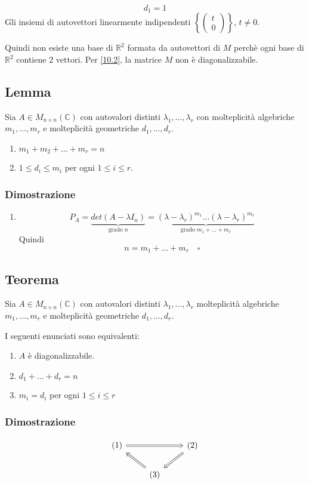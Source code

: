 \documentclass[a4paper]{article}
\theoremstyle{break}
\theoremstyle{break}
\theoremstyle{break}
\theoremstyle{break}
\begin{document}
\begin{example}
  \[
  d_1 = 1
  \] 
  Gli insiemi di autovettori linearmente indipendenti \( \left\{ \begin{pmatrix} t\\0 \end{pmatrix}  \right\} \),
  \( t \neq 0 \).

  \vspace{1em}
  \noindent Quindi non esiste una base di \( \mathbb{R}^2 \) formata da autovettori di \( M \) 
  perchè ogni base di \( \mathbb{R}^2 \) contiene 2 vettori. Per \ref{10.2}, la matrice
  \( M \) non è diagonalizzabile.
\end{example}

\subsection{Lemma}
Sia \( A \in M_{n \times n}(\mathbb{C}) \) con autovalori distinti \( \lambda_1, \ldots, \lambda_r \)
con molteplicità algebriche \( m_1, \ldots, m_r \) e molteplicità geometriche \( d_1, \ldots, d_r \).
\begin{enumerate}
  \item \( m_1 + m_2 + \ldots + m_r = n \) 
  \item \( 1 \le d_i \le m_i \) per ogni \( 1 \le i \le r \).
\end{enumerate}

\subsubsection{Dimostrazione}
\begin{enumerate}
  \item \[
      P_A = \underbrace{det(A - \lambda I_n)}_{\text{grado }n} = \underbrace{(\lambda - \lambda_r)^{m_1} \ldots (\lambda - \lambda_r)^{m_r}}_{\text{grado }m_1 + \ldots + m_r}
    \]
    Quindi
    \[
    n = m_1 + \ldots + m_r \quad \square
    \] 
\end{enumerate}

\subsection{Teorema}
Sia \( A \in M_{n \times n}(\mathbb{C}) \) con autovalori distinti \( \lambda_1, \ldots, \lambda_r \) 
molteplicità algebriche \( m_1, \ldots, m_r \) e molteplicità geometriche \( d_1, \ldots, d_r \).

\noindent I seguenti enunciati sono equivalenti:
\begin{enumerate}
  \item \( A \) è diagonalizzabile.
  \item \( d_1 + \ldots + d_r = n \)
  \item \( m_i = d_i \) per ogni \( 1 \le i \le r \)
\end{enumerate}

\subsubsection{Dimostrazione}
\[
  \begin{tikzcd}
    (1) \arrow[rr, Rightarrow] & & (2) \arrow[dl, Rightarrow] \\
                               & (3) \arrow[ul, Rightarrow] & 
  \end{tikzcd}
\]
\end{document}
